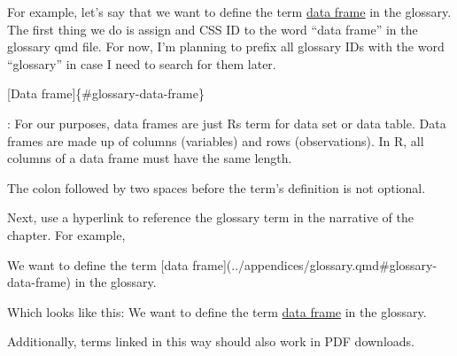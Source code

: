 \documentclass[
  letterpaper,
  DIV=11,
  numbers=noendperiod]{scrreprt}
\newenvironment{Shaded}{\begin{snugshade}}{\end{snugshade}}
\newcommand{\CommentTok}[1]{\textcolor[rgb]{0.37,0.37,0.37}{#1}}
\newcommand{\NormalTok}[1]{\textcolor[rgb]{0.00,0.23,0.31}{#1}}
\newcommand{\OtherTok}[1]{\textcolor[rgb]{0.00,0.23,0.31}{#1}}
\begin{document}
For example, let's say that we want to define the term
\href{../appendices/glossary.qmd}{data frame} in the glossary. The first
thing we do is assign and CSS ID to the word ``data frame'' in the
glossary qmd file. For now, I'm planning to prefix all glossary IDs with
the word ``glossary'' in case I need to search for them later.

\begin{Shaded}
\begin{Highlighting}[]
\CommentTok{[}\OtherTok{Data frame}\CommentTok{]}\NormalTok{\{\#glossary{-}data{-}frame\} }

\NormalTok{:  For our purposes, data frames are just R\textquotesingle{}s term for data set or data table. Data frames are made up of columns (variables) and rows (observations). In R, all columns of a data frame must have the same length.}
\end{Highlighting}
\end{Shaded}

\begin{tcolorbox}[enhanced jigsaw, breakable, title=\textcolor{quarto-callout-important-color}{\faExclamation}\hspace{0.5em}{Definition lists}, bottomrule=.15mm, coltitle=black, left=2mm, colbacktitle=quarto-callout-important-color!10!white, colback=white, toprule=.15mm, leftrule=.75mm, arc=.35mm, colframe=quarto-callout-important-color-frame, bottomtitle=1mm, toptitle=1mm, opacityback=0, titlerule=0mm, opacitybacktitle=0.6, rightrule=.15mm]

The colon followed by two spaces before the term's definition is not
optional.

\end{tcolorbox}

Next, use a hyperlink to reference the glossary term in the narrative of
the chapter. For example,

\begin{Shaded}
\begin{Highlighting}[]
\NormalTok{We want to define the term }\CommentTok{[}\OtherTok{data frame}\CommentTok{](../appendices/glossary.qmd\#glossary{-}data{-}frame)}\NormalTok{ in the glossary.}
\end{Highlighting}
\end{Shaded}

Which looks like this: We want to define the term
\hyperref[glossary-data-frame]{data frame} in the glossary.

Additionally, terms linked in this way should also work in PDF
downloads.
\end{document}
